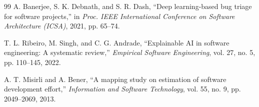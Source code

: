 \documentclass[final,1p,times]{elsarticle}
\begin{document}
\begin{thebibliography}{99}
A. Banerjee, S. K. Debnath, and S. R. Dash, ``Deep learning-based bug triage for software projects,'' in \emph{Proc. IEEE International Conference on Software Architecture (ICSA)}, 2021, pp. 65--74.

T. L. Ribeiro, M. Singh, and C. G. Andrade, ``Explainable AI in software engineering: A systematic review,'' \emph{Empirical Software Engineering}, vol. 27, no. 5, pp. 110--145, 2022.

A. T. Misirli and A. Bener, ``A mapping study on estimation of software development effort,'' \emph{Information and Software Technology}, vol. 55, no. 9, pp. 2049--2069, 2013.

\end{thebibliography}
\end{document}
